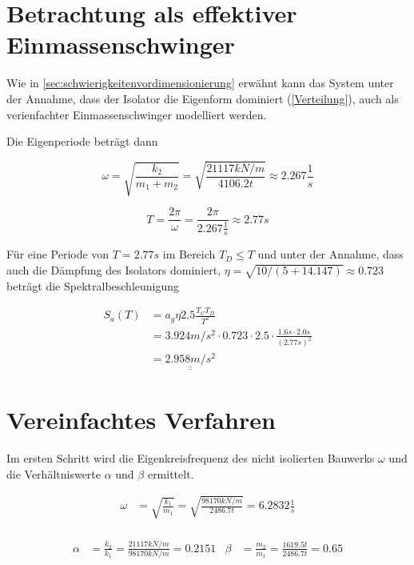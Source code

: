 \section{Betrachtung als effektiver Einmassenschwinger}

Wie in \cref{sec:schwierigkeitenvordimensionierung} erwähnt kann das System unter der Annahme, dass der Isolator die Eigenform dominiert (\cref{Verteilung}), auch als verienfachter Einmassenschwinger modelliert werden.

Die Eigenperiode beträgt dann

\begin{equation*}
\omega = \sqrt{\frac{k_2}{m_1 + m_2}} = \sqrt{\frac{21117 kN/m}{4106.2 t}} \approx 2.267 \frac{1}{s}
\end{equation*}

\begin{equation*}
T = \frac{2 \pi}{\omega} = \frac{2 \pi}{2.267 \frac{1}{s}} \approx 2.77 s
\end{equation*}

Für eine Periode von $T = 2.77 s$ im Bereich $T_D \leq T$ und unter der Annahme, dass auch die Dämpfung des Isolators dominiert, $\eta=\sqrt{10/(5+14.147)} \approx 0.723$ beträgt die Spektralbeschleunigung

\begin{align*}
S_a(T) &= a_g \eta 2.5 \frac{T_C T_D}{T^2}\\
       &= 3.924 m/s^2 \cdot 0.723 \cdot 2.5 \cdot \frac{1.6 s \cdot 2.0 s}{(2.77 s)^2}\\
       &= \underline{\underline{2.958 m/s^2}}
\end{align*}

\section{Vereinfachtes Verfahren}

Im ersten Schritt wird die Eigenkreisfrequenz des nicht isolierten Bauwerks $\omega$ und die Verhältniswerte $\alpha$ und $\beta$ ermittelt.

\begin{align*}
\omega &= \sqrt{\frac{k_1}{m_1}} = \sqrt{\frac{98170 kN/m}{2486.7 t}} = 6.2832 \frac{1}{s}\\
\end{align*}

\begin{align*}
\alpha &= \frac{k_2}{k_1} = \frac{21117 kN/m}{98170 kN/m} = 0.2151 & \beta  &= \frac{m_2}{m_1} = \frac{1619.5 t}{2486.7 t} = 0.65\\
\end{align*}

